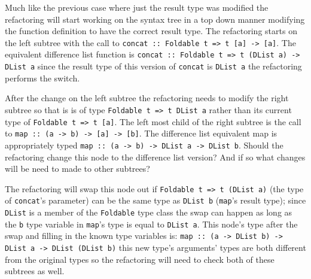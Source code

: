 Much like the previous case where just the result type was modified the refactoring will start working on the syntax tree in a top down manner modifying the function definition to have the correct result type. The refactoring starts on the left subtree with the call to \texttt{concat :: Foldable t => t [a] -> [a]}. The equivalent difference list function is \texttt{concat :: Foldable t => t (DList a) -> DList a} since the result type of this version of \texttt{concat} is \texttt{DList a} the refactoring performs the switch. 

After the change on the left subtree the refactoring needs to modify the right subtree so that is is of type \texttt{Foldable t => t DList a} rather than its current type of \texttt{Foldable t => t [a]}. The left most child of the right subtree is the call to \texttt{map :: (a -> b) -> [a] -> [b]}. The difference list equivalent map is appropriately typed \texttt{map :: (a -> b) -> DList a -> DList b}. Should the refactoring change this node to the difference list version? And if so what changes will be need to made to other subtrees?

The refactoring will swap this node out if \texttt{Foldable t => t (DList a)} (the type of \texttt{concat}'s parameter) can be the same type as \texttt{DList b} (\texttt{map}'s result type); since \texttt{DList} is a member of the \texttt{Foldable} type class the swap can happen as long as the \texttt{b} type variable in \texttt{map}'s type is equal to \texttt{DList a}. This node's type after the swap and filling in the known type variables is: \texttt{map :: (a -> DList b) -> DList a -> DList (DList b)} this new type's arguments' types are both different from the original types so the refactoring will need to check both of these subtrees as well. 

